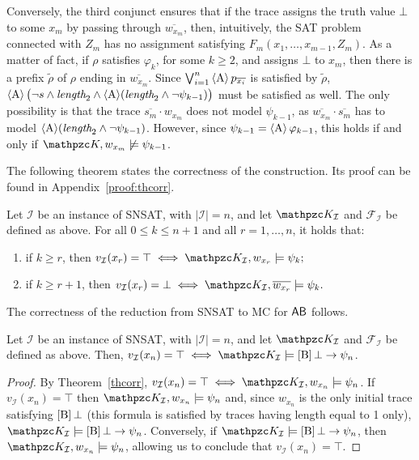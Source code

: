 Conversely, the third conjunct ensures that if the trace assigns the truth value $\bot$ to some $x_m$ by passing through $\overline{w_{x_m}}$, then, intuitively, the SAT problem connected with $Z_m$ has no assignment satisfying $F_m(x_1, \ldots, x_{m-1}, Z_m)$. As a matter of fact, if $\rho$ satisfies $\varphi_k$, for some $k\geq 2$, and assigns $\bot$ to $x_m$, then there is a prefix $\tilde{\rho}$ of $\rho$ ending in $\overline{w_{x_m}}$. Since  $\bigvee_{i=1}^n\operatorname{\langle A\rangle} p_{\overline{x_i}}$ is satisfied by $\tilde{\rho}$, $\operatorname{\langle A\rangle}\big(\neg s \wedge \textit{length}_2\wedge \operatorname{\langle A\rangle} (\textit{length}_2\wedge \neg\psi_{k-1})\big)$ must be satisfied as well. The only possibility is that the trace $\overline{s_m}\cdot w_{x_m}$ does not model $\psi_{k-1}$, as $\overline{w_{x_m}}\cdot \overline{s_m}$ has to model $\operatorname{\langle A\rangle} (\textit{length}_2\wedge \neg\psi_{k-1})$. However, since $\psi_{k-1}=\operatorname{\langle A\rangle}\varphi_{k-1}$, this holds if and only if $\Ku, w_{x_m}\not \models\psi_{k-1}$.

The following theorem states the correctness of the construction. Its proof can be found in Appendix~\ref{proof:thcorr}.
\begin{theorem}\label{thcorr} 
Let $\mathcal{I}$ be an instance of SNSAT, with $|\mathcal{I}|=n$, and let $\Ku_\mathcal{I}$ and $\mathcal{F}_\mathcal{I}$
be defined as above. For all $0\leq k\leq n+1$ and all $r=1,\ldots , n$, it holds that:
	\begin{enumerate}
		\item if $k\geq r$, then $v_\mathcal{I}(x_r)=\top \iff \Ku_\mathcal{I},w_{x_r}\models \psi_k;$
		\item if $k\geq r+1$, then $v_\mathcal{I}(x_r)=\bot \iff \Ku_\mathcal{I},\overline{w_{x_r}}\models \psi_k.$
	\end{enumerate}
\end{theorem}

The correctness of the reduction from SNSAT to MC for $\mathsf{AB}$ follows.

\begin{corollary}\label{corol:c} Let $\mathcal{I}$ be an instance of SNSAT, with $|\mathcal{I}|=n$, and let $\Ku_\mathcal{I}$ and $\mathcal{F}_\mathcal{I}$
be defined as above. Then, 
$v_\mathcal{I}(x_n)=\top \iff \Ku_\mathcal{I}\models \hsBu\bot \rightarrow\psi_n$.
\end{corollary}
\begin{proof}
By Theorem~\ref{thcorr}, $v_\mathcal{I}(x_n)=\top \iff \Ku_\mathcal{I},w_{x_n}\models \psi_n$. If $v_\mathcal{I}(x_n)=\top$ then $\Ku_\mathcal{I},w_{x_n}\models \psi_n$ and, since $w_{x_n}$ is the only initial trace satisfying $\operatorname{\mathopen[ B \mathclose]}\bot$ (this formula is satisfied by traces having length equal to 1 only), $\Ku_\mathcal{I}\models \hsBu\bot \rightarrow\psi_n$. Conversely, if $\Ku_\mathcal{I}\models \hsBu\bot \rightarrow\psi_n$, then $\Ku_\mathcal{I},w_{x_n}\models \psi_n$, allowing us to conclude that $v_\mathcal{I}(x_n)=\top$.
\end{proof}

